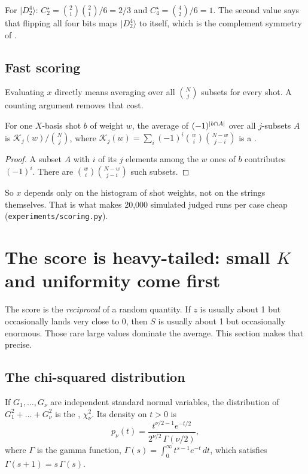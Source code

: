 \documentclass[11pt]{scrartcl}
\newcommand{\ket}[1]{\lvert #1\rangle}
\newcommand{\D}[2]{D^{#1}_{#2}}
\newcommand{\file}[1]{\texttt{\small #1}}
\begin{document}
\begin{example}
  For $\ket{\D42}$: $C^\star_2=\binom21\binom21/6=2/3$ and $C^\star_4=\binom42/6=1$. The second
  value says that flipping all four bits maps $\ket{\D42}$ to itself, which is the complement
  symmetry of .
\end{example}

\subsection{Fast scoring}

Evaluating $x$ directly means averaging over all $\binom Nj$ subsets for every shot. A counting
argument removes that cost.

\begin{claim*}
  For one $X$-basis shot $b$ of weight $w$, the average of $(-1)^{\left\lvert b\cap A \right\rvert}$ over all $j$-subsets
  $A$ is $\mathcal K_j(w)/\binom Nj$, where
  $\mathcal K_j(w)=\sum_i(-1)^i\binom wi\binom{N-w}{j-i}$ is a .
\end{claim*}
\begin{proof}
  A subset $A$ with $i$ of its $j$ elements among the $w$ ones of $b$ contributes $(-1)^i$. There
  are $\binom wi\binom{N-w}{j-i}$ such subsets.
\end{proof}

So $x$ depends only on the histogram of shot weights, not on the strings themselves. That is
what makes 20{,}000 simulated judged runs per case cheap (\file{experiments/scoring.py}).

\section{The score is heavy-tailed: small \texorpdfstring{$K$}{K} and uniformity come first}\label{sec:score}

The score is the \emph{reciprocal} of a random quantity. If $z$ is usually about 1 but
occasionally lands very close to 0, then $S$ is usually about 1 but occasionally enormous. Those
rare large values dominate the average. This section makes that precise.

\subsection{The chi-squared distribution}

\begin{definition}
  If $G_1,\dots,G_\nu$ are independent standard normal variables, the distribution of
  $G_1^2+\dots+G_\nu^2$ is the ,
  $\chi^2_\nu$. Its density on $t>0$ is
  \[
    p_\nu(t)=\frac{t^{\nu/2-1}e^{-t/2}}{2^{\nu/2}\,\Gamma(\nu/2)},
  \]
  where $\Gamma$ is the gamma function, $\Gamma(s)=\int_0^\infty t^{s-1}e^{-t}\,dt$, which satisfies
  $\Gamma(s+1)=s\,\Gamma(s)$.
\end{definition}
\end{document}
